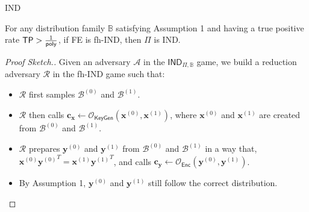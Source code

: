 \begin{frame}{IND}

\begin{theorem}
	For any distribution family $\mathbb{B}$ satisfying Assumption 1 and having a true positive rate $\textsf{TP} > \frac{1}{\mathsf{poly}}$, if \textsf{FE} is fh-IND, then $\Pi$ is IND.
\end{theorem}
\pause

\begin{proof}[Proof Sketch.]

Given an adversary $\mathcal{A}$ in the $\textsf{IND}_{\Pi, \mathbb{B}}$ game, we build a reduction adversary $\mathcal{R}$ in the fh-IND game such that:
\pause

\begin{itemize}
	\item $\mathcal{R}$ first samples $\mathcal{B}^{(0)}$ and $\mathcal{B}^{(1)}$.
	\pause

	\item $\mathcal{R}$ then calls $\mathbf{c_x} \gets \mathcal{O}_{\textsf{KeyGen}}(\mathbf{x}^{(0)}, \mathbf{x}^{(1)})$, where $\mathbf{x}^{(0)}$ and $\mathbf{x}^{(1)}$ are created from $\mathcal{B}^{(0)}$ and $\mathcal{B}^{(1)}$.
	\pause

	\item $\mathcal{R}$ prepares $\mathbf{y}^{(0)}$ and $ \mathbf{y}^{(1)}$ from $\mathcal{B}^{(0)}$ and $\mathcal{B}^{(1)}$ in a way that, $\mathbf{x}^{(0)}{\mathbf{y}^{(0)}}^T = \mathbf{x}^{(1)}{\mathbf{y}^{(1)}}^T$, and calls $\mathbf{c_y} \gets \mathcal{O}_{\textsf{Enc}}(\mathbf{y}^{(0)}, \mathbf{y}^{(1)} )$.
	\pause

	\item By Assumption 1, $\mathbf{y}^{(0)}$ and $ \mathbf{y}^{(1)}$ still follow the correct distribution.
\end{itemize}

\end{proof}

\end{frame}


